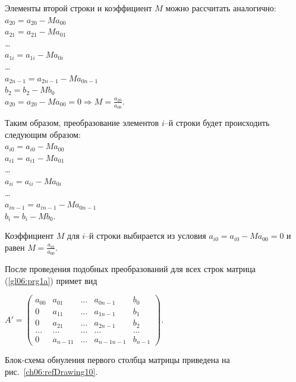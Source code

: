 Элементы второй строки и коэффициент $M$ можно рассчитать аналогично:\\
$a_{20}=a_{20}-Ma_{00}$\\
$a_{21}=a_{21}-Ma_{01}$\\
…\\
$a_{1i}=a_{1i}-Ma_{0i}$\\
… \\
$a_{2n-1}=a_{2n-1}-Ma_{0n-1}$\\  
$b_2=b_2-Mb_0$\\
$a_{20}=a_{20}-Ma_{00}=0 \Rightarrow M=\frac{a_{20}}{a_{00}}$.

Таким образом, преобразование элементов $i$–й строки будет происходить следующим образом:\\
$a_{i0}=a_{i0}-Ma_{00}$\\  
$a_{i1}=a_{i1}-Ma_{01}$\\ 
…\\ 
$a_{ii}=a_{ii}-Ma_{0i}$\\
 …\\  
$a_{in-1}=a_{in-1}-Ma_{0n-1}$\\
$b_i=b_i-Mb_0$.

Коэффициент $M$ для $i$–й строки выбирается из условия
$a_{i0}=a_{i0}-Ma_{00}=0$
и равен 
 $M=\frac{a_{i0}}{a_{00}}$.

После проведения подобных преобразований для всех строк матрица (\ref{gl06:prg1a}) примет вид

$A'=\left(\begin{matrix}a_{00}&a_{01}&...&a_{0n-1}&b_0\\0&a_{11}&...&a_{1n-1}&b_1\\0&a_{21}&...&a_{2n-1}&b_2\\...&...&...&...&...\\0&a_{n-11}&...&a_{n-1n-1}&b_{n-1}\end{matrix}\right)$.

Блок-схема обнуления первого столбца матрицы приведена на рис.~\ref{ch06:refDrawing10}.

